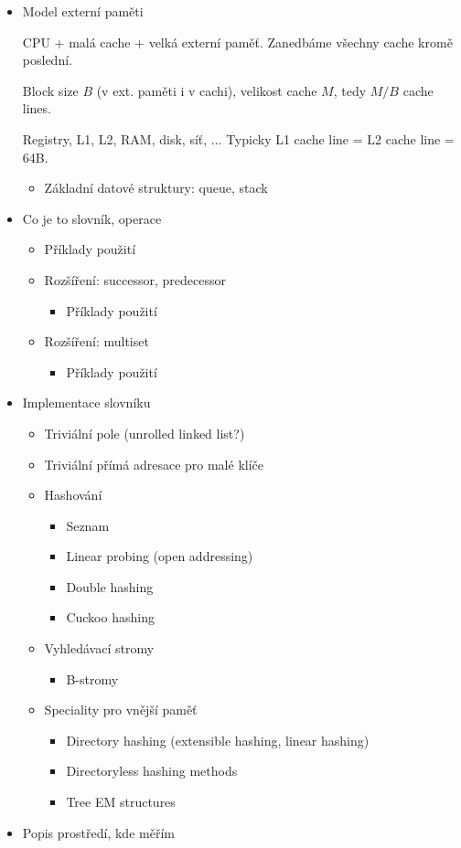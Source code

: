 \begin{itemize}
\item Model externí paměti

	CPU + malá cache + velká externí paměť.
	Zanedbáme všechny cache kromě poslední.

	Block size $B$ (v ext. paměti i v cachi),
	velikost cache $M$, tedy $M/B$ cache lines.

	Registry, L1, L2, RAM, disk, síť, ...
	Typicky L1 cache line = L2 cache line = 64B.
	\cite{Vit}

	\begin{itemize}
	\item Základní datové struktury: queue, stack
	\end{itemize}

\item Co je to slovník, operace
	\begin{itemize}
	\item Příklady použití
	\item Rozšíření: successor, predecessor
		\begin{itemize}
		\item Příklady použití
		\end{itemize}
	\item Rozšíření: multiset
		\begin{itemize}
		\item Příklady použití
		\end{itemize}
	\end{itemize}

\item Implementace slovníku
	\begin{itemize}
	\item Triviální pole (unrolled linked list?)
	\item Triviální přímá adresace pro malé klíče
	\item Hashování
		\begin{itemize}
		\item Seznam
		\item Linear probing (open addressing)
		\item Double hashing
		\item Cuckoo hashing
		\end{itemize}
	\item Vyhledávací stromy
		\begin{itemize}
		\item B-stromy
		\end{itemize}

	\item Speciality pro vnější paměť
		\begin{itemize}
		\item Directory hashing (extensible hashing, linear hashing) 
		\item Directoryless hashing methods
		\item Tree EM structures
		\end{itemize}
	\end{itemize}


\item Popis prostředí, kde měřím
\end{itemize}
